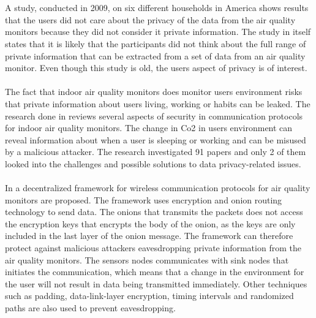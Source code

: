 \\\\
A study, conducted in 2009, on six different households in America shows results that the users did not care about the privacy of the data from the air quality monitors because they did not consider it private information. \cite{inAirPrivacy} The study in itself states that it is likely that the participants did not think about the full range of private information that can be extracted from a set of data from an air quality monitor. Even though this study is old, the users aspect of privacy is of interest.
\\\\
The fact that indoor air quality monitors does monitor users environment risks that private information about users living, working or habits can be leaked. \cite{IAQMonitorCommunicationReview} The research done in \cite{IAQMonitorCommunicationReview} reviews several aspects of security in communication protocols for indoor air quality monitors. The change in Co2 in users environment can reveal information about when a user is sleeping or working and can be misused by a malicious attacker. The research investigated 91 papers and only 2 of them looked into the challenges and possible solutions to data privacy-related issues.  
\\\\
In \cite{PrivacyAndFrameworkDecentAQM} a decentralized framework for wireless communication protocols for air quality monitors are proposed. The framework uses encryption and onion routing technology to send data. The onions that transmits the packets does not access the encryption keys that encrypts the body of the onion, as the keys are only included in the last layer of the onion message. The framework can therefore protect against malicious attackers eavesdropping private information from the air quality monitors. The sensors nodes communicates with sink nodes that initiates the communication, which means that a change in the environment for the user will not result in data being transmitted immediately. Other techniques such as padding, data-link-layer encryption, timing intervals and randomized paths are also used to prevent eavesdropping. 
\\\\
